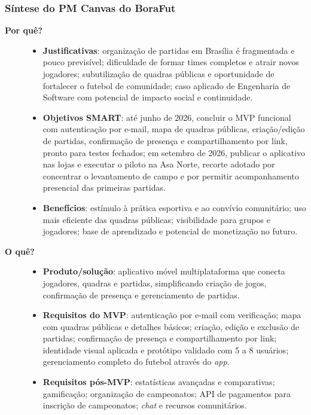         \subsubsection*{Síntese do PM Canvas do BoraFut}
            \begin{description}
                \item[\textbf{Por quê?}] 
                \begin{itemize}
                    \item \textbf{Justificativas}: organização de partidas em Brasília é fragmentada e pouco previsível; dificuldade de formar times completos e atrair novos jogadores; subutilização de quadras públicas e oportunidade de fortalecer o futebol de comunidade; caso aplicado de Engenharia de Software com potencial de impacto social e continuidade.
                    \item \textbf{Objetivos SMART}: até junho de 2026, concluir o MVP funcional com autenticação por e-mail, mapa de quadras públicas, criação/edição de partidas, confirmação de presença e compartilhamento por link, pronto para testes fechados; em setembro de 2026, publicar o aplicativo nas lojas e executar o piloto na Asa Norte, recorte adotado por concentrar o levantamento de campo e por permitir acompanhamento presencial das primeiras partidas.
                    \item \textbf{Benefícios}: estímulo à prática esportiva e ao convívio comunitário; uso mais eficiente das quadras públicas; visibilidade para grupos e jogadores; base de aprendizado e potencial de monetização no futuro.
                \end{itemize}

                \item[\textbf{O quê?}] 
                \begin{itemize}
                    \item \textbf{Produto/solução}: aplicativo móvel multiplataforma que conecta jogadores, quadras e partidas, simplificando criação de jogos, confirmação de presença e gerenciamento de partidas.
                    \item \textbf{Requisitos do MVP}: autenticação por e-mail com verificação; mapa com quadras públicas e detalhes básicos; criação, edição e exclusão de partidas; confirmação de presença e compartilhamento por link; identidade visual aplicada e protótipo validado com 5 a 8 usuários; gerenciamento completo do futebol através do \textit{app}.
                    \item \textbf{Requisitos pós-MVP}: estatísticas avançadas e comparativas; gamificação; organização de campeonatos; API de pagamentos para inscrição de campeonatos; \textit{chat} e recursos comunitários.
                \end{itemize}


\end{description}
